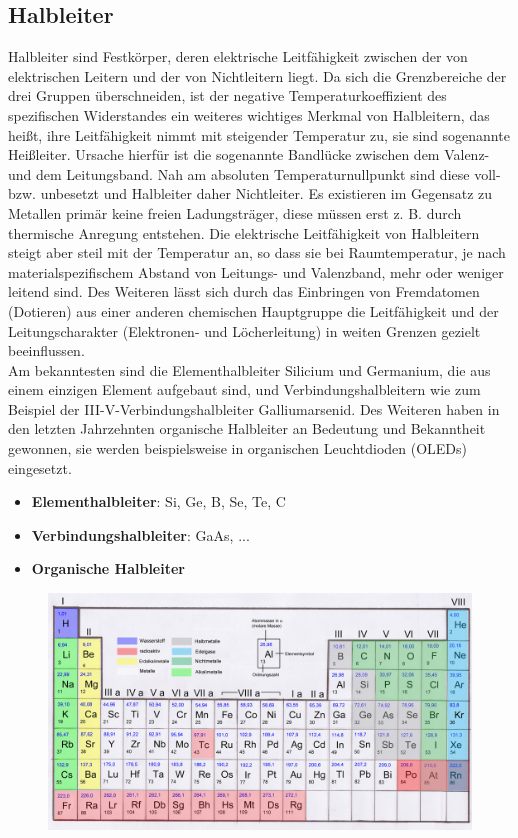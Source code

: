 		\subsection{Halbleiter}
			Halbleiter sind Festkörper, deren elektrische Leitfähigkeit zwischen der von elektrischen Leitern und der von Nichtleitern liegt. Da sich die Grenzbereiche der drei Gruppen überschneiden, ist der negative Temperaturkoeffizient des spezifischen Widerstandes ein weiteres wichtiges Merkmal von Halbleitern, das heißt, ihre Leitfähigkeit nimmt mit steigender Temperatur zu, sie sind sogenannte Heißleiter. Ursache hierfür ist die sogenannte Bandlücke zwischen dem Valenz- und dem Leitungsband. Nah am absoluten Temperaturnullpunkt sind diese voll- bzw. unbesetzt und Halbleiter daher Nichtleiter. Es existieren im Gegensatz zu Metallen primär keine freien Ladungsträger, diese müssen erst z. B. durch thermische Anregung entstehen. Die elektrische Leitfähigkeit von Halbleitern steigt aber steil mit der Temperatur an, so dass sie bei Raumtemperatur, je nach materialspezifischem Abstand von Leitungs- und Valenzband, mehr oder weniger leitend sind. Des Weiteren lässt sich durch das Einbringen von Fremdatomen (Dotieren) aus einer anderen chemischen Hauptgruppe die Leitfähigkeit und der Leitungscharakter (Elektronen- und Löcherleitung) in weiten Grenzen gezielt beeinflussen.\\
			Am bekanntesten sind die Elementhalbleiter Silicium und Germanium, die aus einem einzigen Element aufgebaut sind, und Verbindungshalbleitern wie zum Beispiel der III-V-Verbindungshalbleiter Galliumarsenid. Des Weiteren haben in den letzten Jahrzehnten organische Halbleiter an Bedeutung und Bekanntheit gewonnen, sie werden beispielsweise in organischen Leuchtdioden (OLEDs) eingesetzt.
			\begin{itemize}
				\item \textbf{Elementhalbleiter}: Si, Ge, B, Se, Te, C
				\item \textbf{Verbindungshalbleiter}: GaAs, ...
				\item \textbf{Organische Halbleiter}
			\end{itemize}
			\begin{figure}[h]
				\centering
				\includegraphics[width=0.73\linewidth]{./pics/el/periodensys}
			\end{figure}

